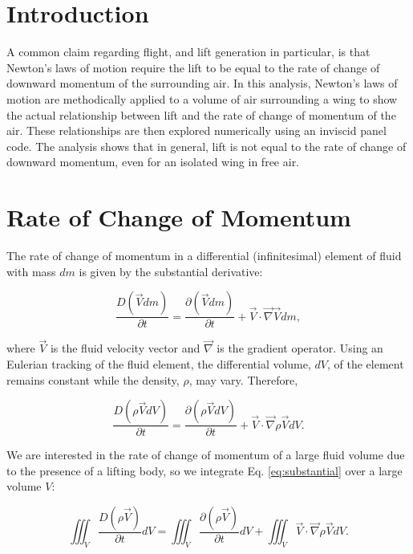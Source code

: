 \documentclass[11pt]{article}
\begin{document}
\section{Introduction}

A common claim regarding flight, and lift generation in particular, is that
Newton's laws of motion require the lift to be equal to the rate of change of
downward momentum of the surrounding air. In this analysis, Newton's laws of
motion are methodically applied to a volume of air surrounding a wing to show
the actual relationship between lift and the rate of change of momentum of the
air. These relationships are then explored numerically using an inviscid panel
code. The analysis shows that in general, lift is not equal to the rate of
change of downward momentum, even for an isolated wing in free air.

\section{Rate of Change of Momentum}\label{sec:momchange}

The rate of change of momentum in a differential (infinitesimal) element of
fluid with mass $dm$ is given by the substantial derivative:

\begin{equation}
\frac{D(\vec{V}dm)}{\partial t} = \frac{\partial(\vec{V}dm)}{\partial t}
                                 + \vec{V}\cdot\vec{\nabla}\vec{V}dm,
\end{equation}

\noindent where $\vec{V}$ is the fluid velocity vector and $\vec{\nabla}$ is the
gradient operator. Using an Eulerian tracking of the fluid element, the
differential volume, $dV$, of the element remains constant while the density,
$\rho$, may vary. Therefore,

\begin{equation}
\frac{D(\rho\vec{V}dV)}{\partial t} = \frac{\partial(\rho\vec{V}dV)}{\partial t}
                                    + \vec{V}\cdot\vec{\nabla}\rho\vec{V}dV.
\label{eq:substantial}
\end{equation}

We are interested in the rate of change of momentum of a large fluid volume due
to the presence of a lifting body, so we integrate Eq. \ref{eq:substantial} over
a large volume $V$:

\begin{equation}
\iiint_V\frac{D(\rho\vec{V})}{\partial t}dV = 
\iiint_V\frac{\partial(\rho\vec{V})}{\partial t}dV +
\iiint_V\vec{V}\cdot\vec{\nabla}\rho\vec{V}dV.
\label{eq:total_momchange}
\end{equation}
\end{document}
